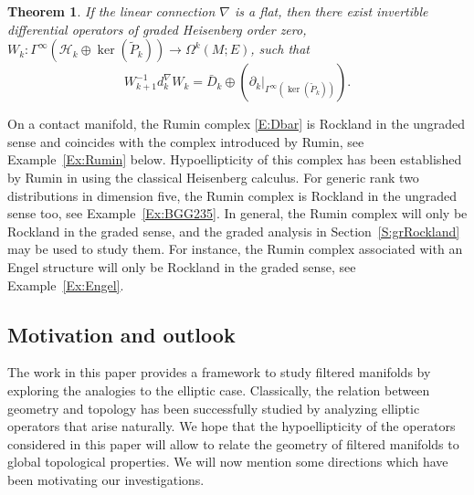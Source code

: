 \documentclass[reqno,12pt]{amsart}
\newcounter{ABC}
\theoremstyle{plain}
\newtheorem{thm}[ABC]{Theorem}
\theoremstyle{definition}
\begin{document}
\begin{thm}\label{thmE}
If the linear connection $\nabla$ is a flat, then there exist invertible differential operators of graded Heisenberg order zero, $W_k\colon\Gamma^\infty(\mathcal H_k\oplus\ker(\tilde P_k))\to\Omega^k(M;E)$, such that
$$
W^{-1}_{k+1}d^\nabla_kW_k=\bar D_k\oplus(\partial_k|_{\Gamma^\infty(\ker(\tilde P_k))}).
$$
\end{thm}


On a contact manifold, the Rumin complex \eqref{E:Dbar} is Rockland in the ungraded sense and coincides with the complex introduced by Rumin, see Example~\ref{Ex:Rumin} below.
Hypoellipticity of this complex has been established by Rumin in \cite{R00} using the classical Heisenberg calculus.
For generic rank two distributions in dimension five, the Rumin complex is Rockland in the ungraded sense too, see Example~\ref{Ex:BGG235}.
In general, the Rumin complex will only be Rockland in the graded sense, and the graded analysis in Section~\ref{S:grRockland} may be used to study them.
For instance, the Rumin complex associated with an Engel structure will only be Rockland in the graded sense, see Example~\ref{Ex:Engel}.





\subsection{Motivation and outlook}





The work in this paper provides a framework to study filtered manifolds by exploring the analogies to the elliptic case.
Classically, the relation between geometry and topology has been successfully studied by analyzing elliptic operators that arise naturally.
We hope that the hypoellipticity of the operators considered in this paper will allow to relate the geometry of filtered manifolds to global topological properties.
We will now mention some directions which have been motivating our investigations.
\end{document}
